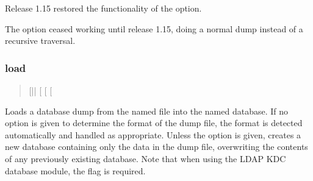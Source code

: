 \documentclass[letterpaper,10pt,english]{sphinxmanual}
\begin{document}
\begin{description}
\sphinxAtStartPar
{}Release 1.15 restored the functionality of the 
option.

\sphinxAtStartPar
{}The  option ceased working until release 1.15,
doing a normal dump instead of a recursive traversal.

\end{description}


\subsubsection{load}
\label{\detokenize{admin/admin_commands/kdb5_util:load}}\label{\detokenize{admin/admin_commands/kdb5_util:kdb5-util-dump-end}}\label{\detokenize{admin/admin_commands/kdb5_util:kdb5-util-load}}\begin{quote}

\sphinxAtStartPar
{} {[}||\sphinxstylestrong{\sphinxhyphen{}r18}{]} {[}\sphinxstylestrong{\sphinxhyphen{}hash}{]}
{[}\sphinxstylestrong{\sphinxhyphen{}verbose}{]} {[}\sphinxstylestrong{\sphinxhyphen{}update}{]} 
\end{quote}

\sphinxAtStartPar
Loads a database dump from the named file into the named database.  If
no option is given to determine the format of the dump file, the
format is detected automatically and handled as appropriate.  Unless
the  option is given,  creates a new database
containing only the data in the dump file, overwriting the contents of
any previously existing database.  Note that when using the LDAP KDC
database module, the  flag is required.
\end{document}
